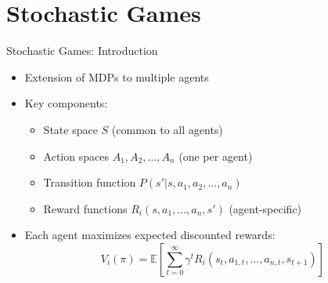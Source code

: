 \documentclass[10pt]{beamer}
\begin{document}

\section{Stochastic Games}


\begin{frame}{Stochastic Games: Introduction}
    \begin{itemize}
        \item Extension of MDPs to multiple agents
        \item Key components:
        \begin{itemize}
            \item State space $S$ (common to all agents)
            \item Action spaces $A_1, A_2, ..., A_n$ (one per agent)
            \item Transition function $P(s'|s,a_1,a_2,...,a_n)$
            \item Reward functions $R_i(s,a_1,...,a_n,s')$ (agent-specific)
        \end{itemize}
        \vspace{0.3cm}
        \item Each agent maximizes expected discounted rewards:
        \begin{equation}
            V_i(\pi) = \mathbb{E}\left[\sum_{t=0}^{\infty} \gamma^t R_i(s_t,a_{1,t},...,a_{n,t},s_{t+1}) \right]
        \end{equation}
    \end{itemize}
\end{frame}

\end{document}
